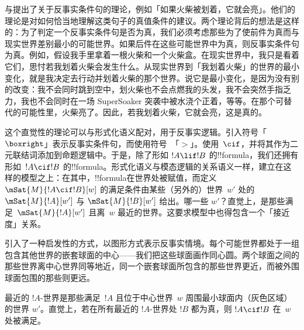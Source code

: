 \documentclass[../../../include/open-logic-section]{subfiles}
\begin{document}


与提出了关于反事实条件句的理论，例如「如果火柴被划着，它就会亮」。他们的理论是对如何恰当地理解这类句子的真值条件的建议。两个理论背后的想法是这样的：为了判定一个反事实条件句是否为真，我们必须考虑那些为了使前件为真而与现实世界差别最小的可能世界。如果后件在这些可能世界中为真，则反事实条件句为真。例如，假设我手里拿着一根火柴和一个火柴盒。在现实世界中，我只是看着它们，思忖若我划着火柴会发生什么。从现实世界到「我划着火柴」的世界的最小变化，就是我决定去行动并划着火柴的那个世界。说它是最小变化，是因为没有别的改变：我不会同时跳到空中，划火柴也不会点燃我的头发，我不会突然手指乏力，我也不会同时在一场 SuperSoaker 突袭中被水浇个正着，等等。在那个可替代的可能性里，火柴亮了。因此，若我划着火柴，它就会亮，这是真的。

这个直觉性的理论可以与形式化语义配对，用于反事实逻辑。引入符号「$\boxright$」表示反事实条件句，而使用符号~「$>$」。使用~$\cif$，并将其作为二元联结词添加到命题逻辑中。于是，除了形如 $!A \lif
!B$ 的!!{formula}，我们还拥有形如~$!A \cif !B$ 的!!{formula}。形式化语义与模态逻辑的关系语义一样，建立在这样的模型之上：在其中，!!{formula}在世界处被赋值，而定义 $\mSat{M}{!A \cif !B}[w]$ 的满足条件由某些（另外的）世界~$w'$ 处的 $\mSat{M}{!A}[w']$ 与 $\mSat{M}{!B}[w']$ 给出。哪一些 $w'$？直觉上，是那些满足~$\mSat{M}{!A}[w']$ 且离~$w$ 最近的世界。这要求模型中也得包含一个「接近度」关系。

引入了一种启发性的方式，以图形方式表示反事实情境。每个可能世界都处于一组包含其他世界的嵌套球面的中心——我们把这些球面画作同心圆。两个球面之间的那些世界离中心世界同等地近，同一个嵌套球面所包含的那些世界更近，而被外围球面包围的那些则更远。
\begin{center}
\end{center}
最近的 $!A$-世界是那些满足~$!A$ 且位于中心世界~$w$ 周围最小球面内（灰色区域）的世界 $w'$。直觉上，若在所有最近的 $!A$-世界处 $!B$ 都为真，则 $!A \cif !B$ 在~$w$ 处被满足。
\end{document}
